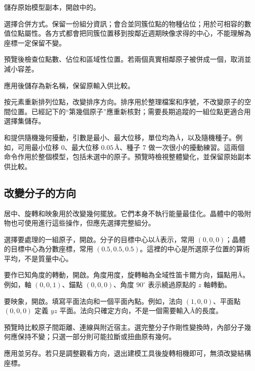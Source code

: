 \begin{steps}
  \item 儲存原始模型副本，開啟中的。
  \item 選擇合併方式。保留一份組分資訊；會合並同簇位點的物種佔位；用於可相容的數值位點屬性。各方式都會把同簇位置移到按鄰近週期映像求得的中心，不能理解為座標一定保留不變。
  \item 預覽後檢查位點數、佔位和區域性位置。若兩個真實相鄰原子被併成一個，取消並減小容差。
  \item 應用後儲存為新名稱，保留原輸入供比較。
\end{steps}

按元素重新排列位點，改變排序方向。排序用於整理檔案和序號，不改變原子的空間位置。已經記下的“第幾個原子”應重新核對；需要長期追蹤的一組位點更適合用選擇集儲存。

和提供隨機幾何擾動，引數是最小、最大位移，單位均為\AA，以及隨機種子。例如，可用最小位移 0、最大位移 $0.05\,\text{\AA}$、種子 7 做一次很小的擾動練習。這兩個命令作用於整個模型，包括未選中的原子。預覽時檢視整體變化，並保留原始副本供比較。

\subsection{改變分子的方向}\label{sec:orientation-reference}

居中、旋轉和映象用於改變幾何擺放。它們本身不執行能量最佳化。晶體中的吸附物也可使用進行這些操作，但應先選擇完整組分。



\begin{steps}
  \item 選擇要處理的一組原子，開啟。分子的目標中心以\AA 表示，常用 \((0,0,0)\)；晶體的目標中心為分數座標，常用 \((0.5,0.5,0.5)\)。這裡的中心是所選原子位置的算術平均，不是質量中心。
  \item 要作已知角度的轉動，開啟。角度用度，旋轉軸為全域性笛卡爾方向，錨點用\AA。例如，軸 \((0,0,1)\)、錨點 \((0,0,0)\)、角度 $90^\circ$ 表示繞過原點的 $z$ 軸轉動。
  \item 要映象，開啟。填寫平面法向和一個平面內點。例如，法向 \((1,0,0)\)、平面點 \((0,0,0)\) 定義 $yz$ 平面。法向只確定方向，不是一個需要輸入\AA 的長度。
  \item 預覽時比較原子間距離、連線與附近宿主。選完整分子作剛性變換時，內部分子幾何應保持不變；只選一部分則可能拉斷或扭曲原有幾何。
  \item 應用並另存。若只是調整觀看方向，退出建模工具後旋轉相機即可，無須改變結構座標。
\end{steps}

